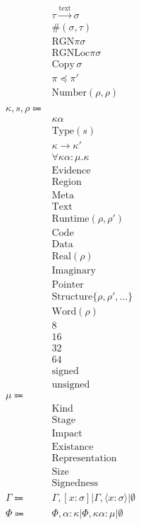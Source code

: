 \documentclass {article}
\begin{document}
\begin{align*}
& \tau \xrightarrow{\text{text}} \sigma  \tag*{[Function Literal Type]} \\
& \#(\sigma, \tau) \tag*{[Runtime Pair]} \\
& \text{RGN} \pi \sigma \tag*{[Region Transformer]} \\
& \text{RGNLoc} \pi \sigma \tag*{[Reference]} \\
& \text{Copy} \, \sigma \tag*{[Runtime Copyable]} \\
& \pi \preceq \pi' \tag*{[Region Scoping]} \\
& \text{Number} (\rho, \rho) \tag*{[Number]} \\
\\
\kappa, s, \rho \Coloneqq & \\
& \kappa \alpha \tag*{[Kind Variable]} \\
& \text{Type} (s) \tag*{[Type]} \\
& \kappa \to \kappa' \tag*{[Higher Kinded]} \\
& \forall \kappa \alpha : \mu. \kappa \tag*{[Poly Kinded]}\\
& \text{Evidence} \tag*{[Evidence Stage]} \\
& \text{Region} \tag*{[Region]} \\
& \text{Meta} \tag*{[Meta Stage]}\\
& \text{Text} \tag*{[Symbol Stage]} \\
& \text{Runtime} (\rho, \rho') \tag*{[Runtime Stage]}\\
& \text{Code} \tag*{[Code Impact]}\\
& \text{Data} \tag*{[Data Impact]}\\
& \text{Real} (\rho) \tag*{[Real Existance]} \\
& \text{Imaginary} \tag*{[Imaginary Existance]} \\
& \text{Pointer} \tag*{[Pointer Representation]}\\
& \text{Structure} \{ \rho, \rho', \dots \} \tag*{[Structure Representation]} \\
& \text{Word} (\rho) \tag*{[Word Representation]} \\
& 8 \tag*{[Byte Size]} \\
& 16 \tag*{[Short Size]} \\
& 32 \tag*{[Int Size]} \\
& 64 \tag*{[Long Size]} \\
& \text{signed} \tag*{[Signed]} \\
& \text{unsigned} \tag*{[Unsigned]}
\\
\mu \Coloneqq & \\
& \text{Kind} \\
& \text{Stage} \\
& \text{Impact} \\
& \text{Existance} \\
& \text{Representation} \\
& \text{Size} \\
& \text{Signedness}
\\
\Gamma \Coloneqq & \Gamma, [x : \sigma] | \Gamma, \langle x : \sigma \rangle | \emptyset \\
\Phi \Coloneqq & \Phi, \alpha : \kappa | \Phi, \kappa \alpha : \mu |  \emptyset \\
\end{align*}
\end{document}

